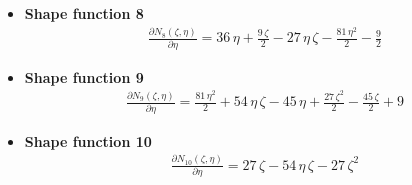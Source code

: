 \documentclass{article}
\begin{document}
\begin{itemize}
	
	\item \textbf{Shape function 8}\newline
	\begin{align}
	\frac{\partial N_8(\zeta, \eta)}{\partial \eta} = 36\,\eta +\frac{9\,\zeta}{2}-27\,\eta \,\zeta-\frac{81\,\eta ^2}{2}-\frac{9}{2}
	\end{align}
	
	
	\item \textbf{Shape function 9}\newline
	\begin{align}
	\frac{\partial N_9(\zeta, \eta)}{\partial \eta} = \frac{81\,\eta ^2}{2}+54\,\eta \,\zeta-45\,\eta +\frac{27\,{\zeta}^2}{2}-\frac{45\,\zeta}{2}+9
	\end{align}
	
	
	\item \textbf{Shape function 10}\newline
	\begin{align}
	\frac{\partial N_{10}(\zeta, \eta)}{\partial \eta} = 27\,\zeta-54\,\eta \,\zeta-27\,{\zeta}^2
	\end{align}
\end{itemize}
\end{document}
